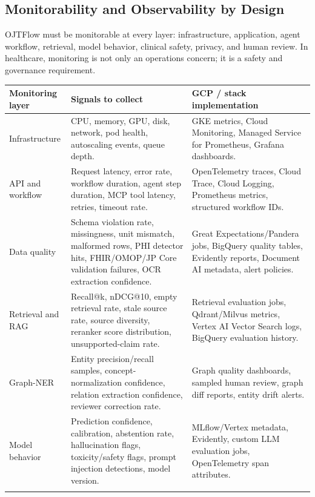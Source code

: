 \subsection{Monitorability and Observability by Design}

OJTFlow must be monitorable at every layer: infrastructure, application, agent workflow, retrieval, model behavior, clinical safety, privacy, and human review. In healthcare, monitoring is not only an operations concern; it is a safety and governance requirement.

\begin{longtable}{p{}p{}p{}}
\toprule
\textbf{Monitoring layer} & \textbf{Signals to collect} & \textbf{GCP / stack implementation} \\
\midrule
Infrastructure & CPU, memory, GPU, disk, network, pod health, autoscaling events, queue depth. & GKE metrics, Cloud Monitoring, Managed Service for Prometheus, Grafana dashboards. \\
\addlinespace
API and workflow & Request latency, error rate, workflow duration, agent step duration, MCP tool latency, retries, timeout rate. & OpenTelemetry traces, Cloud Trace, Cloud Logging, Prometheus metrics, structured workflow IDs. \\
\addlinespace
Data quality & Schema violation rate, missingness, unit mismatch, malformed rows, PHI detector hits, FHIR/OMOP/JP Core validation failures, OCR extraction confidence. & Great Expectations/Pandera jobs, BigQuery quality tables, Evidently reports, Document AI metadata, alert policies. \\
\addlinespace
Retrieval and RAG & Recall@k, nDCG@10, empty retrieval rate, stale source rate, source diversity, reranker score distribution, unsupported-claim rate. & Retrieval evaluation jobs, Qdrant/Milvus metrics, Vertex AI Vector Search logs, BigQuery evaluation history. \\
\addlinespace
Graph-NER & Entity precision/recall samples, concept-normalization confidence, relation extraction confidence, reviewer correction rate. & Graph quality dashboards, sampled human review, graph diff reports, entity drift alerts. \\
\addlinespace
Model behavior & Prediction confidence, calibration, abstention rate, hallucination flags, toxicity/safety flags, prompt injection detections, model version. & MLflow/Vertex metadata, Evidently, custom LLM evaluation jobs, OpenTelemetry span attributes. \\
\addlinespace

\end{longtable}
